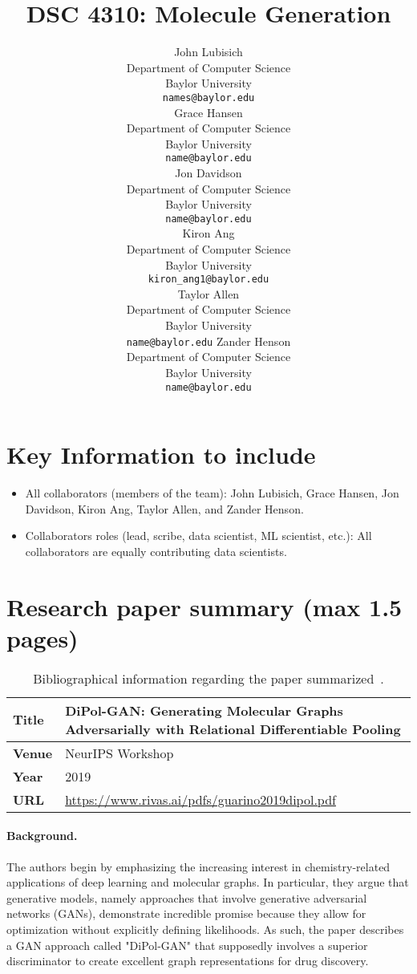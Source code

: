 \documentclass{article}
\title{
  DSC 4310: Molecule Generation \\
  \vspace{1em}
}
\author{
John Lubisich \\
  Department of Computer Science \\
  Baylor University \\
  \texttt{names@baylor.edu} \\
\And
   Grace Hansen \\
   Department of Computer Science \\
   Baylor University \\
   \texttt{name@baylor.edu} \\
\And
   Jon Davidson \\
   Department of Computer Science \\
   Baylor University \\
   \texttt{name@baylor.edu} \\ 
\And
   Kiron Ang \\
   Department of Computer Science \\
   Baylor University \\
   \texttt{kiron\_ang1@baylor.edu} \\
\And
   Taylor Allen \\
   Department of Computer Science \\
   Baylor University \\
   \texttt{name@baylor.edu}
\And
   Zander Henson \\
   Department of Computer Science \\
   Baylor University \\
   \texttt{name@baylor.edu}
}
\begin{document}
\maketitle

\section{Key Information to include}

\begin{itemize}
    \item All collaborators (members of the team): John Lubisich, Grace Hansen, Jon Davidson, Kiron Ang, Taylor Allen, and Zander Henson.
    \item Collaborators roles (lead, scribe, data scientist, ML scientist, etc.): All collaborators are equally contributing data scientists.
\end{itemize}


\section{Research paper summary (max 1.5 pages)}

\begin{table}[h]
    \centering
    \begin{tabular}{ll}
        \toprule
        \textbf{Title} & DiPol-GAN: Generating Molecular Graphs Adversarially with Relational Differentiable Pooling\\
        \midrule
        \textbf{Venue} & NeurIPS Workshop \\
        \textbf{Year}  & 2019 \\
        \textbf{URL}   & \url{https://www.rivas.ai/pdfs/guarino2019dipol.pdf} \\
        \bottomrule
    \end{tabular}
    \vspace{1em}
    \caption{Bibliographical information regarding the paper summarized~\cite{rivas}.}
\end{table}

\paragraph{Background.}
The authors begin by emphasizing the increasing interest in chemistry-related applications of deep learning and molecular graphs. In particular, they argue that generative models, namely approaches that involve generative adversarial networks (GANs), demonstrate incredible promise because they allow for optimization without explicitly defining likelihoods. As such, the paper describes a GAN approach called "DiPol-GAN" that supposedly involves a superior discriminator to create excellent graph representations for drug discovery. 
\end{document}
